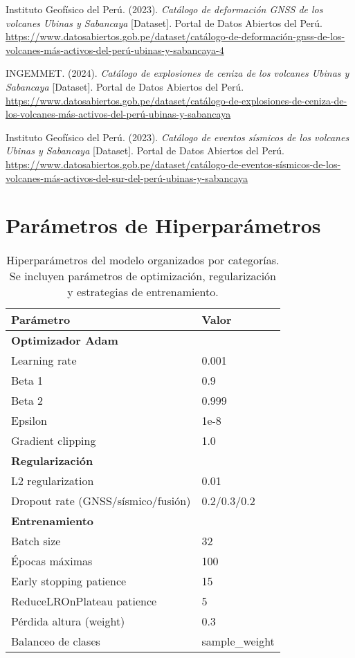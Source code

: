 \documentclass[11pt,a4paper]{article}
\begin{document}
\begin{thebibliography}{99}
Instituto Geofísico del Perú. (2023). \textit{Catálogo de deformación GNSS de los volcanes Ubinas y Sabancaya} [Dataset]. Portal de Datos Abiertos del Perú. \url{https://www.datosabiertos.gob.pe/dataset/catálogo-de-deformación-gnss-de-los-volcanes-más-activos-del-perú-ubinas-y-sabancaya-4}

INGEMMET. (2024). \textit{Catálogo de explosiones de ceniza de los volcanes Ubinas y Sabancaya} [Dataset]. Portal de Datos Abiertos del Perú. \url{https://www.datosabiertos.gob.pe/dataset/catálogo-de-explosiones-de-ceniza-de-los-volcanes-más-activos-del-perú-ubinas-y-sabancaya}

Instituto Geofísico del Perú. (2023). \textit{Catálogo de eventos sísmicos de los volcanes Ubinas y Sabancaya} [Dataset]. Portal de Datos Abiertos del Perú. \url{https://www.datosabiertos.gob.pe/dataset/catálogo-de-eventos-sísmicos-de-los-volcanes-más-activos-del-sur-del-perú-ubinas-y-sabancaya}
\end{thebibliography}

\newpage
\appendix


\section{Parámetros de Hiperparámetros}

\begin{table}[H]
    \centering
    \begin{tabular}{ll}
        \toprule
        Parámetro & Valor \\
        \midrule
        \textbf{Optimizador Adam} & \\
        Learning rate & 0.001 \\
        Beta 1 & 0.9 \\
        Beta 2 & 0.999 \\
        Epsilon & 1e-8 \\
        Gradient clipping & 1.0 \\
        \midrule
        \textbf{Regularización} & \\
        L2 regularization & 0.01 \\
        Dropout rate (GNSS/sísmico/fusión) & 0.2/0.3/0.2 \\
        \midrule
        \textbf{Entrenamiento} & \\
        Batch size & 32 \\
        Épocas máximas & 100 \\
        Early stopping patience & 15 \\
        ReduceLROnPlateau patience & 5 \\
        Pérdida altura (weight) & 0.3 \\
        Balanceo de clases & sample\_weight \\
        \bottomrule
    \end{tabular}
    \caption{Hiperparámetros del modelo organizados por categorías. Se incluyen parámetros de optimización, regularización y estrategias de entrenamiento.}
    \label{tab:hiperparametros}
\end{table}
\end{document}
